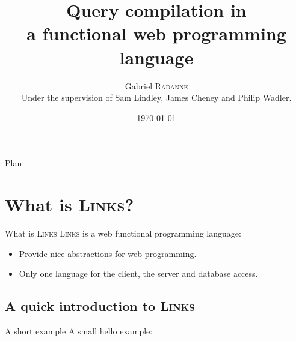 \documentclass[11pt]{beamer}
\title[Query compilation in \links]{Query compilation in\\ a functional web programming language}
\author[Gabriel Radanne]{Gabriel \textsc{Radanne}\\ {\footnotesize Under the supervision of Sam Lindley, James Cheney and Philip Wadler.}}
\institute[]{University of Edinburgh}
\date{\today}
\newcommand\mysc[1]{{\rmfamily\textsc{#1}}\xspace}
\newcommand\links{\mysc{Links}}
\newcommand\linkslst[1]{}
\begin{document}
\begin{frame}[plain]
\titlepage  
\end{frame}


\begin{frame}{Plan}

\tableofcontents[section]

\end{frame}


\section{What is \links ?}

\begin{frame}{What is \links}
  \links is a web functional programming language:
  \begin{itemize}
  \item Provide nice abstractions for web programming.
  \item Only one language for the client, the server and database access.
  \end{itemize}
\end{frame}


\subsection{A quick introduction to \links}

\begin{frame}[fragile]{A short example}
  A small hello example:\newline
  
\end{frame}
\end{document}
